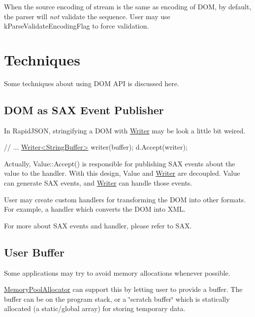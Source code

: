 When the source encoding of stream is the same as encoding of D\+OM, by default, the parser will {\itshape not} validate the sequence. User may use {\ttfamily k\+Parse\+Validate\+Encoding\+Flag} to force validation.\hypertarget{md_Cadriciel_Commun_Externe_RapidJSON_doc_sax.zh-cn_Techniques}{}\section{Techniques}\label{md_Cadriciel_Commun_Externe_RapidJSON_doc_sax.zh-cn_Techniques}
Some techniques about using D\+OM A\+PI is discussed here.

\subsection*{D\+OM as S\+AX Event Publisher}

In Rapid\+J\+S\+ON, stringifying a D\+OM with {\ttfamily \hyperlink{class_writer}{Writer}} may be look a little bit weired.


\begin{DoxyCode}
\textcolor{comment}{// ...}
\hyperlink{class_writer}{Writer<StringBuffer>} writer(buffer);
d.Accept(writer);
\end{DoxyCode}


Actually, {\ttfamily Value\+::\+Accept()} is responsible for publishing S\+AX events about the value to the handler. With this design, {\ttfamily Value} and {\ttfamily \hyperlink{class_writer}{Writer}} are decoupled. {\ttfamily Value} can generate S\+AX events, and {\ttfamily \hyperlink{class_writer}{Writer}} can handle those events.

User may create custom handlers for transforming the D\+OM into other formats. For example, a handler which converts the D\+OM into X\+ML.

For more about S\+AX events and handler, please refer to S\+AX.\hypertarget{md_Cadriciel_Commun_Externe_RapidJSON_doc_dom_UserBuffer}{}\subsection{User Buffer}\label{md_Cadriciel_Commun_Externe_RapidJSON_doc_dom_UserBuffer}
Some applications may try to avoid memory allocations whenever possible.

{\ttfamily \hyperlink{class_memory_pool_allocator}{Memory\+Pool\+Allocator}} can support this by letting user to provide a buffer. The buffer can be on the program stack, or a \char`\"{}scratch buffer\char`\"{} which is statically allocated (a static/global array) for storing temporary data.

